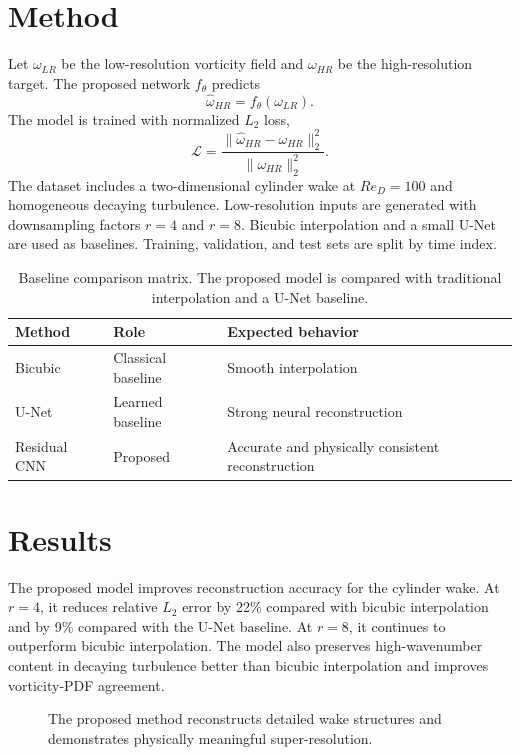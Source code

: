 \documentclass[11pt]{article}
\begin{document}
\section{Method}
Let $\omega_{LR}$ be the low-resolution vorticity field and $\omega_{HR}$ be the high-resolution target. The proposed network $f_\theta$ predicts
\begin{equation}
\hat{\omega}_{HR}=f_\theta(\omega_{LR}).
\end{equation}
The model is trained with normalized $L_2$ loss,
\begin{equation}
\mathcal{L}=\frac{\|\hat{\omega}_{HR}-\omega_{HR}\|_2^2}{\|\omega_{HR}\|_2^2}.
\end{equation}
The dataset includes a two-dimensional cylinder wake at $Re_D=100$ and homogeneous decaying turbulence. Low-resolution inputs are generated with downsampling factors $r=4$ and $r=8$. Bicubic interpolation and a small U-Net are used as baselines. Training, validation, and test sets are split by time index.

\begin{table}[t]
\centering
\caption{Baseline comparison matrix. The proposed model is compared with traditional interpolation and a U-Net baseline.}
\begin{tabular}{lll}
\toprule
Method & Role & Expected behavior \\
\midrule
Bicubic & Classical baseline & Smooth interpolation \\
U-Net & Learned baseline & Strong neural reconstruction \\
Residual CNN & Proposed & Accurate and physically consistent reconstruction \\
\bottomrule
\end{tabular}
\end{table}

\section{Results}
The proposed model improves reconstruction accuracy for the cylinder wake. At $r=4$, it reduces relative $L_2$ error by 22\% compared with bicubic interpolation and by 9\% compared with the U-Net baseline. At $r=8$, it continues to outperform bicubic interpolation. The model also preserves high-wavenumber content in decaying turbulence better than bicubic interpolation and improves vorticity-PDF agreement.

\begin{figure}[t]
\centering
{}
\caption{The proposed method reconstructs detailed wake structures and demonstrates physically meaningful super-resolution.}
\end{figure}
\end{document}
